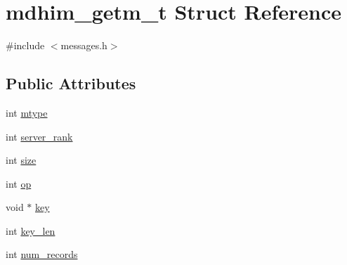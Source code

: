 \hypertarget{structmdhim__getm__t}{\section{mdhim\-\_\-getm\-\_\-t Struct Reference}
\label{d9/d54/structmdhim__getm__t}
}


{\ttfamily \#include $<$messages.\-h$>$}

\subsection*{Public Attributes}
\begin{DoxyCompactItemize}
\item 
int \hyperlink{structmdhim__getm__t_a803aef9942bd6bd39d10c22f4f1205d3}{mtype}
\item 
int \hyperlink{structmdhim__getm__t_a2fe10e46b27b008657d3c59299ea1fd6}{server\-\_\-rank}
\item 
int \hyperlink{structmdhim__getm__t_aa6649f87300a3899693521850fa28a17}{size}
\item 
int \hyperlink{structmdhim__getm__t_a81dd92f402e433928b8b3bae7ccdefd8}{op}
\item 
void $\ast$ \hyperlink{structmdhim__getm__t_a53c3aff6037a3e693e09ff4e98bd7eba}{key}
\item 
int \hyperlink{structmdhim__getm__t_a8942a21db02e749c3f3b04b32fea795e}{key\-\_\-len}
\item 
int \hyperlink{structmdhim__getm__t_ad585955cf1b7a3ffce40fc44062583e9}{num\-\_\-records}
\end{DoxyCompactItemize}


